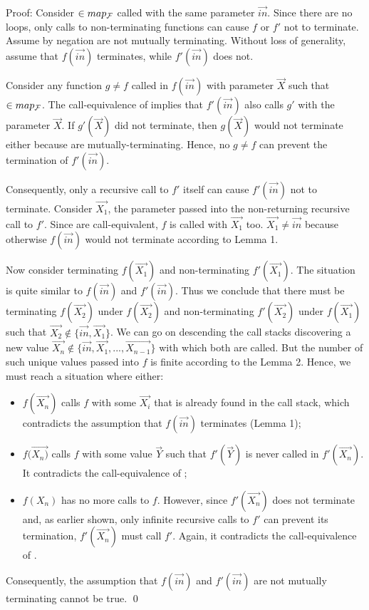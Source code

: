 \documentclass{llncs}
\begin{document}
Proof: Consider $ \in map_{\cal F}$ called with the same parameter $\vec{in}$. Since there are no loops, only calls to non-terminating functions can cause $f$ or $f'$ not to terminate. Assume by negation  are not mutually terminating. Without loss of generality, assume that $f(\vec{in})$ terminates, while $f'(\vec{in})$ does not. 

Consider any function $g \neq f$ called in $f(\vec{in})$ with parameter $\vec{X}$ such that $\in map_{\cal F}$. The call-equivalence of  implies that $f'(\vec{in})$ also calls $g'$ with the parameter $\vec{X}$. If $g'(\vec{X})$ did not terminate, then $g(\vec{X})$ would not terminate either because  are mutually-terminating. Hence, no $g \neq f$ can prevent the termination of $f'(\vec{in})$. 

Consequently, only a recursive call to $f'$ itself can cause $f'(\vec{in})$ not to terminate. Consider $\vec{X_1}$, the parameter passed into the non-returning recursive call to $f'$. Since  are call-equivalent, $f$ is called with $\vec{X_1}$ too. $\vec{X_1} \neq \vec{in}$ because otherwise $f(\vec{in})$ would not terminate according to Lemma 1.

Now consider terminating $f(\vec{X_1})$ and non-terminating $f'(\vec{X_1})$. The situation is quite similar to $f(\vec{in})$ and $f'(\vec{in})$. Thus we conclude that there must be terminating $f(\vec{X_2})$ under $f(\vec{X_2})$ and non-terminating $f'(\vec{X_2})$ under $f(\vec{X_1})$ such that $\vec{X_2} \notin \{\vec{in}, \vec{X_1}\}$. We can go on descending the call stacks discovering a new value $\vec{X_n} \notin \{\vec{in}, \vec{X_1}, ..., \vec{X_{n-1}}\}$ with which both  are called. But the number of such unique values passed into $f$ is finite according to the Lemma 2. Hence, we must reach a situation where either:
\begin{itemize}
\item $f(\vec{X_n})$ calls $f$ with some $\vec{X_i}$ that is already found in the call stack, which contradicts the assumption that $f(\vec{in})$ terminates (Lemma 1);
\item $f(\vec{X_n)}$ calls $f$ with some value $\vec{Y}$ such that $f'(\vec{Y})$ is never called in $f'(\vec{X_n})$. It contradicts the call-equivalence of ;
\item $f(X_n)$ has no more calls to $f$. However, since $f'(\vec{X_n})$ does not terminate and, as earlier shown, only infinite recursive calls to $f'$ can prevent its termination, $f'(\vec{X_n})$ must call $f'$. Again, it contradicts the call-equivalence of .
\end{itemize}
Consequently, the assumption that $f(\vec{in})$ and $f'(\vec{in})$ are not mutually terminating cannot be true. \qed
\end{document}
